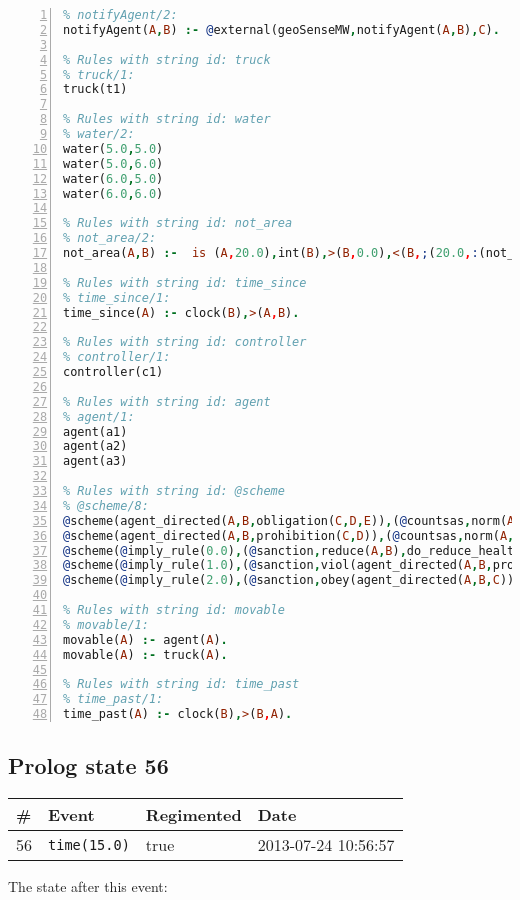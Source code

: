 \documentclass[11pt]{article}\usepackage[utf8]{inputenc}\usepackage{geometry}
\begin{document}
\begin{lstlisting}[language=Prolog, numbers=left]
% Rules with string id: notifyAgent
% notifyAgent/2:
notifyAgent(A,B) :- @external(geoSenseMW,notifyAgent(A,B),C).

% Rules with string id: truck
% truck/1:
truck(t1)

% Rules with string id: water
% water/2:
water(5.0,5.0)
water(5.0,6.0)
water(6.0,5.0)
water(6.0,6.0)

% Rules with string id: not_area
% not_area/2:
not_area(A,B) :-  is (A,20.0),int(B),>(B,0.0),<(B,;(20.0,:(not_area(A,B), is (-(B),20.0)))),int(A),>(A,0.0),<(A,;(20.0,:(area(A,B),-(int(A))))),int(B),>(A,0.0),>(B,0.0),<(A,21.0),<(B,21.0).

% Rules with string id: time_since
% time_since/1:
time_since(A) :- clock(B),>(A,B).

% Rules with string id: controller
% controller/1:
controller(c1)

% Rules with string id: agent
% agent/1:
agent(a1)
agent(a2)
agent(a3)

% Rules with string id: @scheme
% @scheme/8:
@scheme(agent_directed(A,B,obligation(C,D,E)),(@countsas,norm(A,B,F,obligation(C,D,E)),F),false,(listTrue(C)),(time_past(D)),false,[plus(viol(agent_directed(A,B,obligation(C,D,E))))|[]],[plus(obey(agent_directed(A,B,obligation(C,D,E))))|[]])
@scheme(agent_directed(A,B,prohibition(C,D)),(@countsas,norm(A,B,E,prohibition(C,D)),E),(listTrue(C)),false,(false),false,[plus(viol(agent_directed(A,B,prohibition(C,D))))|[]],[plus(obey(agent_directed(A,B,prohibition(C,D))))|[]])
@scheme(@imply_rule(0.0),(@sanction,reduce(A,B),do_reduce_health(A,B),notifyAgent(A,changed(status))),true,false,false,false,[min(reduce(A,B))|[]],[])
@scheme(@imply_rule(1.0),(@sanction,viol(agent_directed(A,B,prohibition(C,D))),do_sanction(D)),true,false,false,false,[min(viol(agent_directed(A,B,prohibition(C,D))))|[]],[])
@scheme(@imply_rule(2.0),(@sanction,obey(agent_directed(A,B,C))),true,false,false,false,[min(obey(agent_directed(A,B,C)))|[]],[])

% Rules with string id: movable
% movable/1:
movable(A) :- agent(A).
movable(A) :- truck(A).

% Rules with string id: time_past
% time_past/1:
time_past(A) :- clock(B),>(B,A).

\end{lstlisting}
\clearpage 
\subsection{Prolog state 56}
\begin{table}[ht]
\centering 
\begin{tabular}{l l l l} 
\textbf{\#} & \textbf{Event} & \textbf{Regimented} & \textbf{Date} \\ [0.5ex] 
\hline
56&\texttt{time(15.0)}&true&2013-07-24 10:56:57\\ [1ex] \hline\end{tabular}
\end{table}
The state after this event:
\end{document}
